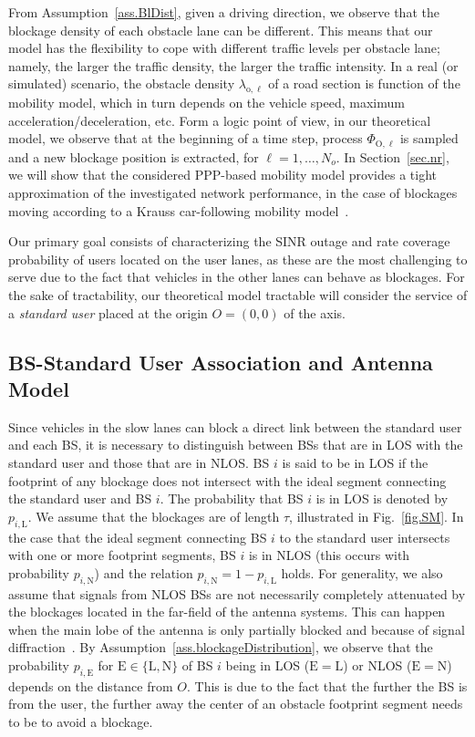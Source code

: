 \documentclass[10pt,journal,a4paper]{IEEEtran}
\begin{document}
From Assumption~\ref{ass.BlDist}, given a driving direction, we observe that the blockage density of each obstacle lane can be different. This means that our model has the flexibility to cope with different traffic levels per obstacle lane; namely, the larger the traffic density, the larger the traffic intensity. {In a real (or simulated) scenario, the obstacle density $\lambda_{\mathrm{o},\ell}$ of a road section is function of the mobility model, which in turn depends on the vehicle speed, maximum acceleration/deceleration, etc. Form a logic point of view, in our theoretical model, we observe that at the beginning of a time step, process $\Phi_{\mathrm{O},\ell}$ is sampled and a new blockage position is extracted, for $\ell = 1, \ldots, N_o$. In Section~\ref{sec.nr}, we will show that the considered PPP-based mobility model provides a tight approximation of the investigated network performance, in the case of blockages moving according to a Krauss car-following mobility model~\cite{Kanagaraj2013390}.}

Our primary goal consists of characterizing the SINR outage and rate coverage probability of users located on the user lanes, as these are the most challenging to serve due to the fact that vehicles in the other lanes can behave as blockages. For the sake of tractability, our theoretical model tractable will consider the service of a \emph{standard user} placed at the origin $O=(0,0)$ of the axis. 


\vspace{-2mm}\subsection{BS-Standard User Association and Antenna Model}\label{sec.LN}
Since vehicles in the slow lanes can block a direct link between the standard user and each BS, it is necessary to distinguish between BSs that are in LOS with the standard user and those that are in NLOS.
{BS $i$ is said to be in LOS if the footprint of any blockage does not intersect with the ideal segment connecting the standard user and BS $i$. The probability that BS $i$ is in LOS is denoted by $p_{i,\mathrm{L}}$.
We assume that the blockages are of length $\tau$, illustrated in Fig.~\ref{fig.SM}. In the case that the ideal segment connecting BS $i$ to the standard user intersects with one or more footprint segments, BS $i$ is in NLOS (this occurs with probability $p_{i,\mathrm{N}}$) and the relation $p_{i,\mathrm{N}} = 1 - p_{i,\mathrm{L}}$ holds. For generality, we also assume that signals from NLOS BSs are not necessarily completely attenuated by the blockages located in the far-field of the antenna systems. This can happen when the main lobe of the antenna is only partially blocked and because of signal diffraction~\cite{Ant1,Ant2}.} By Assumption~\ref{ass.blockageDistribution}, we observe that the probability $p_{i,\mathrm{E}}$ for $\mathrm{E} \in \{\mathrm{L}, \mathrm{N}\}$ of BS $i$ being in LOS ($\mathrm{E} = \mathrm{L}$) or NLOS ($\mathrm{E} = \mathrm{N}$) depends on the distance from $O$. This is due to the fact that the further the BS is from the user, the further away the center of an obstacle footprint segment needs to be to avoid a blockage.
\end{document}
